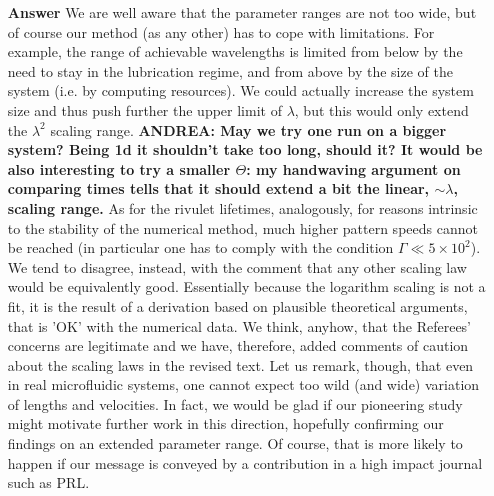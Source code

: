 \documentclass[12pt,english]{article}
\begin{document}
\begin{itemize}
\item[ \textbf{{Answer}}]
{ 
We are well aware that the parameter ranges are not too wide, but 
of course our method (as any other) has to cope with limitations. 
For example, the range of achievable wavelengths is limited from below 
by the need to stay in the lubrication regime, and from above by the size of the system (i.e. by computing resources). We could actually increase the system size and thus push further the upper limit of $\lambda$, but this would only extend the $\lambda^2$ scaling range. {\bf ANDREA: May we try one run on a bigger 
system? Being 1d it shouldn't take too long, should it? It would be also interesting to try a smaller $\Theta$: my handwaving argument on comparing times tells that it should extend a bit the linear, $\sim \lambda$,  scaling range.}
As for the rivulet lifetimes, analogously, for reasons intrinsic to the stability of the numerical method, much higher pattern speeds cannot be reached 
(in particular one has to comply with the condition $\Gamma \ll 5 \times 10^2$).
We tend to disagree, instead, with the comment that any other scaling 
law would be equivalently good. Essentially because the logarithm scaling is 
not a fit, it is the result of a derivation based on plausible theoretical arguments, that 
is 'OK' with the numerical data.
We think, anyhow, that the Referees' concerns are legitimate and we have, therefore, added 
comments of caution about the scaling laws in the revised text.
Let us remark, though, that even in real microfluidic systems, 
one cannot expect too wild (and wide) variation of lengths and velocities.
In fact, we would be glad if our pioneering study might motivate further work 
in this direction, hopefully confirming our findings on an extended parameter 
range. Of course, that is more likely to happen if our message is conveyed
by a contribution in a high impact journal such as PRL. 
}

\end{itemize}



\end{document}
